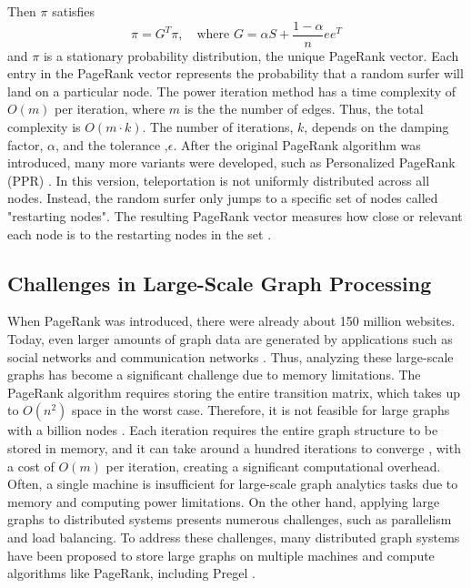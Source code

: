 Then $\pi$ satisfies 
\begin{equation}
    \pi=G^T\pi, \quad \text{where $G=\alpha S +\frac{1-\alpha}{n}ee^T$}
\end{equation}
and $\pi$ is a stationary probability distribution, the unique PageRank vector.
Each entry in the PageRank vector represents the probability that a random surfer will land on a particular node. The power iteration method has a time complexity of $O(m)$ per iteration, where $m$ is the the number of edges. Thus, the total complexity is $O(m\cdot k)$. The number of iterations, $k$, depends on the damping factor, $\alpha$, and the tolerance ,$\epsilon$. After the original PageRank algorithm was introduced, many more variants were developed, such as Personalized PageRank (PPR) \cite{park_survey_2019}.
In this version, teleportation is not uniformly distributed across all nodes. Instead, the random surfer only jumps to a specific set of nodes called  "restarting nodes". The resulting PageRank vector measures how close or relevant each node is to the restarting nodes in the set \cite{priyanta_social_2019}. 

 
\subsection{Challenges in Large-Scale Graph Processing}
When PageRank was introduced, there were already about 150 million websites. Today, even larger amounts of graph data are generated by applications such as social networks and communication networks \cite{gebreegziabher_chapter_2023}. Thus, analyzing these large-scale graphs has become a significant challenge due to memory limitations. The PageRank algorithm requires storing the entire transition matrix, which takes up to $O(n^2)$ space in the worst case. Therefore, it is not feasible for large graphs with a billion nodes \cite{wu_efficient_2024}. Each iteration requires the entire graph structure to be stored in memory, and it can take around a hundred iterations to converge \cite{langville_googles_2012}, with a cost of $O(m)$ per iteration, creating a significant computational overhead. Often, a single machine is insufficient for large-scale graph analytics tasks due to memory and computing power limitations. On the other hand, applying large graphs to distributed systems presents numerous challenges, such as parallelism and load balancing. To address these challenges, many distributed graph systems have been proposed to store large graphs on multiple machines and compute algorithms like PageRank, including Pregel \cite{meng_survey_2024}.



